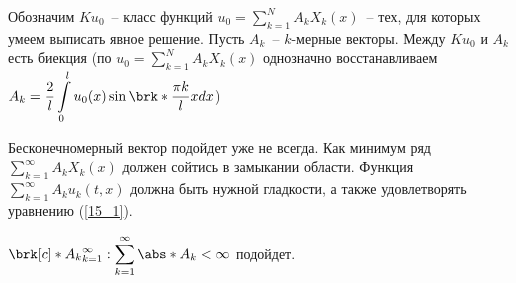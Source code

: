 Обозначим $Ku_0$~-- класс функций $u_0 = \displaystyle\sum\limits_{k=1}^N A_k X_k(x)$~-- тех, для которых умеем выписать явное решение. Пусть $A_k$~-- $k$-мерные векторы. Между $Ku_0$ и $A_k$ есть биекция (по $u_0 = \displaystyle\sum\limits_{k=1}^N A_k X_k(x)$ однозначно восстанавливаем $A_k = \dfrac{2}{l}\displaystyle\int\limits_0^l u_0(x) \sin\brk*{\dfrac{\pi k}{l}x}dx$)

Бесконечномерный вектор подойдет уже не всегда. Как минимум ряд $\displaystyle\sum\limits_{k=1}^\infty A_k X_k(x)$ должен сойтись в замыкании области. Функция $\displaystyle\sum\limits_{k=1}^\infty A_k u_k(t,x)$ должна быть нужной гладкости, а также удовлетворять уравнению (\ref{15_1}).

\begin{statement}
	$\brk[c]*{A_k}_{k=1}^{\infty}: \displaystyle\sum\limits_{k=1}^{\infty} \abs*{A_k} < \infty$ подойдет.
\end{statement}


